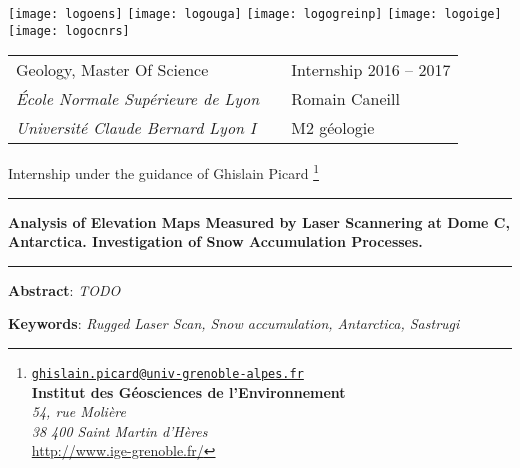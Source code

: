 \documentclass[12pt,a4paper]{article}
\begin{document}
\setlength{\parindent}{0pt}

\thispagestyle{empty}

\texttt{[image: logoens]} \hfill
\texttt{[image: logouga]} \hfill
\texttt{[image: logogreinp]} \hfill
\texttt{[image: logoige]} \hfill
\texttt{[image: logocnrs]}

\vspace{0.5cm}

\begin{tabularx}{\textwidth}{@{} l X l @{} }
{\sc Geology, Master Of Science} & & Internship 2016 -- 2017 \\
{\it École Normale Supérieure de Lyon} & & Romain Caneill\\
{\it Université Claude Bernard Lyon I} & & M2 géologie
\end{tabularx}

\begin{center}
Internship under the guidance of Ghislain Picard
\footnote{\href{mailto:ghislain.picard@univ-grenoble-alpes.fr}{\tt ghislain.picard@univ-grenoble-alpes.fr}\\
{\bf Institut des Géosciences de l'Environnement}\\
{\it 54, rue Molière\\
38 400 Saint Martin d'Hères}\\
\url{http://www.ige-grenoble.fr/}}
\vspace{.3cm}

\rule[5pt]{10cm}{0.5pt}
\vspace{10pt}

\textbf{\Large Analysis of Elevation Maps Measured by Laser Scannering at Dome C, Antarctica.
 Investigation of Snow Accumulation Processes.}
\vspace{8pt}

\rule{10cm}{0.5pt}

\vspace{.3cm}

\parbox{15cm}{\small
\textbf{Abstract}: \it TODO
} %

\vspace{0.5cm}

\parbox{15cm}{
\textbf{Keywords}: \it Rugged Laser Scan, Snow accumulation, Antarctica, Sastrugi
} %

\end{center}
\end{document}

